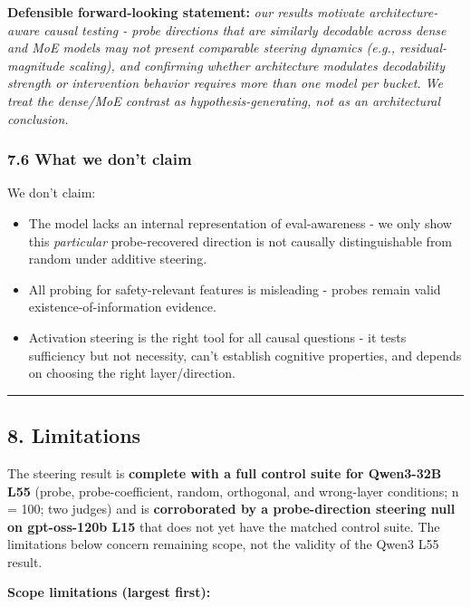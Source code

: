 \documentclass[
]{article}
\providecommand{\tightlist}{%
  \setlength{\itemsep}{0pt}\setlength{\parskip}{0pt}}
\begin{document}
\textbf{Defensible forward-looking statement:} \emph{our results
motivate architecture-aware causal testing - probe directions that are
similarly decodable across dense and MoE models may not present
comparable steering dynamics (e.g., residual-magnitude scaling), and
confirming whether architecture modulates decodability strength or
intervention behavior requires more than one model per bucket. We treat
the dense/MoE contrast as hypothesis-generating, not as an architectural
conclusion.}

\subsubsection{7.6 What we don't claim}\label{what-we-dont-claim}

We don't claim:

\begin{itemize}
\tightlist
\item
  The model lacks an internal representation of eval-awareness - we only
  show this \emph{particular} probe-recovered direction is not causally
  distinguishable from random under additive steering.
\item
  All probing for safety-relevant features is misleading - probes remain
  valid existence-of-information evidence.
\item
  Activation steering is the right tool for all causal questions - it
  tests sufficiency but not necessity, can't establish cognitive
  properties, and depends on choosing the right layer/direction.
\end{itemize}

\begin{center}\rule{0.5\linewidth}{0.5pt}\end{center}

\subsection{8. Limitations}\label{limitations}

The steering result is \textbf{complete with a full control suite for
Qwen3-32B L55} (probe, probe-coefficient, random, orthogonal, and
wrong-layer conditions; n = 100; two judges) and is \textbf{corroborated
by a probe-direction steering null on gpt-oss-120b L15} that does not
yet have the matched control suite. The limitations below concern
remaining scope, not the validity of the Qwen3 L55 result.

\textbf{Scope limitations (largest first):}
\end{document}
